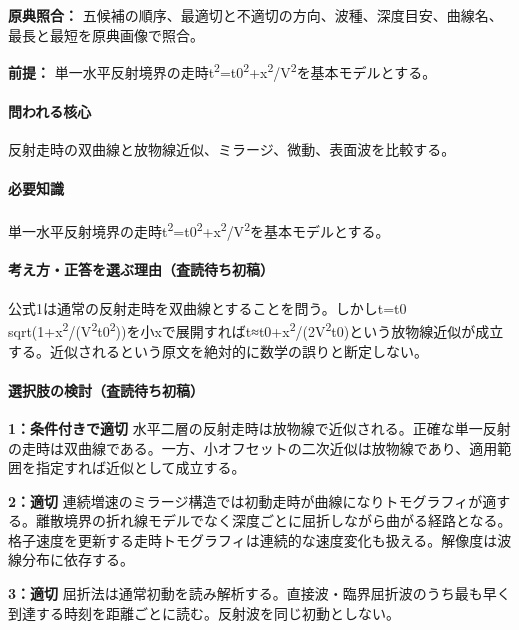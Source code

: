 \noindent\textbf{原典照合：} 五候補の順序、最適切と不適切の方向、波種、深度目安、曲線名、最長と最短を原典画像で照合。\par

\noindent\textbf{前提：} 単一水平反射境界の走時t\textsuperscript{2}=t0\textsuperscript{2}+x\textsuperscript{2}/V\textsuperscript{2}を基本モデルとする。\par

\paragraph{問われる核心} 反射走時の双曲線と放物線近似、ミラージ、微動、表面波を比較する。

\paragraph{必要知識} 単一水平反射境界の走時t\textsuperscript{2}=t0\textsuperscript{2}+x\textsuperscript{2}/V\textsuperscript{2}を基本モデルとする。

\paragraph{考え方・正答を選ぶ理由（査読待ち初稿）} 公式1は通常の反射走時を双曲線とすることを問う。しかしt=\allowbreak{}t0 sqrt(1+x\textsuperscript{2}/(V\textsuperscript{2}t0\textsuperscript{2}))を小xで展開すればt≈t0+x\textsuperscript{2}/(2V\textsuperscript{2}t0)という放物線近似が成立する。近似されるという原文を絶対的に数学の誤りと断定しない。

\paragraph{選択肢の検討（査読待ち初稿）}\mbox{}\par

\noindent\textbf{1：条件付きで適切} 水平二層の反射走時は放物線で近似される。正確な単一反射の走時は双曲線である。一方、小オフセットの二次近似は放物線であり、適用範囲を指定すれば近似として成立する。\par

\noindent\textbf{2：適切} 連続増速のミラージ構造では初動走時が曲線になりトモグラフィが適する。離散境界の折れ線モデルでなく深度ごとに屈折しながら曲がる経路となる。格子速度を更新する走時トモグラフィは連続的な速度変化も扱える。解像度は波線分布に依存する。\par

\noindent\textbf{3：適切} 屈折法は通常初動を読み解析する。直接波・臨界屈折波のうち最も早く到達する時刻を距離ごとに読む。反射波を同じ初動としない。\par

